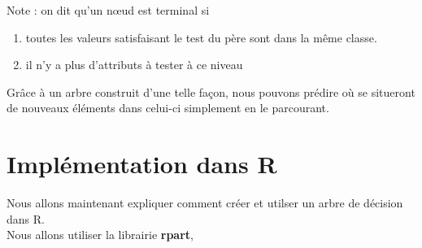 \documentclass[compress]{beamer}
\begin{document}
\begin{frame}
Note : on dit qu'un nœud est terminal si 
\begin{enumerate}
\item toutes les valeurs satisfaisant le test du père sont dans la même classe.
\item il n'y a plus d'attributs à tester à ce niveau
\end{enumerate}

Grâce à un arbre construit d'une telle façon, nous pouvons prédire où se situeront de nouveaux éléments dans celui-ci simplement en le parcourant.
\end{frame}

\section{Implémentation dans R}

\begin{frame}
Nous allons maintenant expliquer comment créer et utilser un arbre de décision dans R.\\

Nous allons utiliser la librairie \textbf{rpart}, 
\end{frame}
\end{document}
